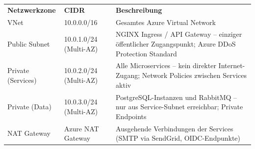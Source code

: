 \begin{tabularx}{\textwidth}{L{3.5cm} L{3.5cm} X}
  \color{white}\textbf{Netzwerkzone} & \color{white}\textbf{CIDR} & \color{white}\textbf{Beschreibung} \\
  VNet & 10.0.0.0/16 & Gesamtes Azure Virtual Network \\
  Public Subnet & 10.0.1.0/24 (Multi-AZ) & NGINX Ingress / API Gateway -- einziger öffentlicher
  Zugangspunkt; Azure DDoS Protection Standard \\
  Private (Services) & 10.0.2.0/24 (Multi-AZ) & Alle Microservices -- kein direkter Internet-Zugang;
  Network Policies zwischen Services aktiv \\
  Private (Data) & 10.0.3.0/24 (Multi-AZ) & PostgreSQL-Instanzen und RabbitMQ --
  nur aus Service-Subnet erreichbar; Private Endpoints \\
  NAT Gateway & Azure NAT Gateway & Ausgehende Verbindungen der Services (SMTP via
  SendGrid, OIDC-Endpunkte) \\
\end{tabularx}